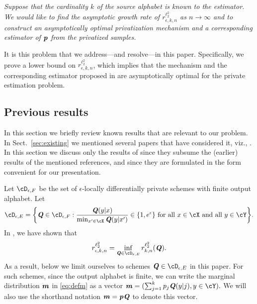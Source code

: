\documentclass[11pt,onecolumn]{IEEEtran}
\def\mathbi#1{{\textbf{\textit #1}}}
\begin{document}
\vspace*{.1in}
 \emph{Suppose that the cardinality $k$ of the source alphabet is known to the estimator. We would like to find the asymptotic growth rate of $r_{\epsilon,k,n}^{\ell_2^2}$ as $n\to\infty$ and to construct an asymptotically optimal privatization mechanism and a corresponding  estimator of $\mathbi{p}$ from the privatized samples.}
  
\vspace*{.1in}  It is this problem that we address---and resolve---in this paper. Specifically, we prove a lower bound
on $r_{\epsilon,k,n}^{\ell_2^2}$, which implies that the mechanism and the corresponding estimator
proposed in \cite{Ye17} are asymptotically optimal for the private estimation problem.





\subsection{Previous results}
In this section we briefly review known results that are relevant to our problem. In Sect.~\ref{sec:existing} we mentioned
several papers that have considered it, viz., \cite{Warner65,Duchi13a,Erlingsson14,Kairouz14,Kairouz16,Wang16,Duchi16}. 
In this section we discuss only the results of \cite{Ye17} since they subsume the (earlier) results of the mentioned references, and
since they are formulated in the form convenient for our presentation.

Let $\cD_{\epsilon,F}$ be the set of $\epsilon$-locally differentially private schemes with finite output alphabet. 
Let
  \begin{equation}\label{eq:DES}
\cD_{\epsilon,E}=\biggl\{ \mathbi{Q}\in\cD_{\epsilon,F}: 
\frac{\mathbi{Q}(y|x)}{\min_{x'\in\cX}\mathbi{Q}(y|x') } \in \{1,e^{\epsilon}\}
\text{~for all~} x\in\cX \text{~and all~} y\in\cY \biggr\}.
  \end{equation}
 In \cite[Theorem IV.5]{Ye17}, we have shown that
\begin{equation}\label{eq:red}
r_{\epsilon,k,n}^{\ell_2^2} = \inf_{\mathbi{Q}\in\cD_{\epsilon,E}} r_{k,n}^{\ell_2^2} (\mathbi{Q}).
\end{equation}
As a result, below we limit ourselves to schemes $\mathbi{Q}\in\cD_{\epsilon,E}$ in this paper. 
For such schemes, since the output alphabet is finite, we can write the marginal distribution $\mathbi{m}$  in \eqref{eq:defm} 
as a vector $\mathbi{m}=(\sum_{j=1}^k p_j \mathbi{Q}(y|j), y\in\cY).$ We will also use the shorthand notation
$\mathbi{m}=\mathbi{p}\mathbi{Q}$ to denote this vector.
\end{document}
